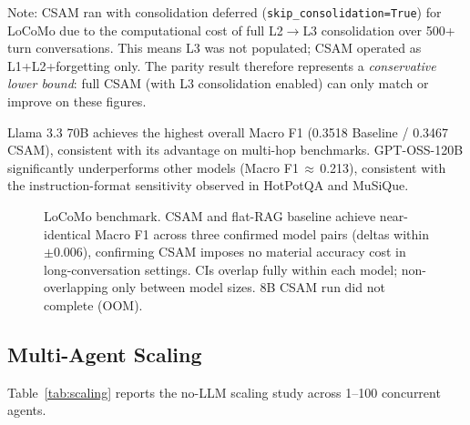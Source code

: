 \documentclass{article}
\begin{document}
Note: CSAM ran with consolidation deferred (\texttt{skip\_consolidation=True})
for LoCoMo due to the computational cost of full L2$\to$L3 consolidation
over 500+ turn conversations.  This means L3 was not populated; CSAM
operated as L1+L2+forgetting only.  The parity result therefore represents
a \emph{conservative lower bound}: full CSAM (with L3 consolidation
enabled) can only match or improve on these figures.

Llama 3.3 70B achieves the highest overall Macro F1 (0.3518 Baseline /
0.3467 CSAM), consistent with its advantage on multi-hop benchmarks.
GPT-OSS-120B significantly underperforms other models (Macro F1\,$\approx$\,0.213),
consistent with the instruction-format sensitivity observed in HotPotQA
and MuSiQue.

\begin{figure}[h]
\centering
{}
\caption{LoCoMo benchmark.  CSAM and flat-RAG baseline achieve near-identical
  Macro F1 across three confirmed model pairs (deltas within $\pm$0.006),
  confirming CSAM imposes no material accuracy cost in long-conversation
  settings.  CIs overlap fully within each model; non-overlapping only
  between model sizes.  8B CSAM run did not complete (OOM).}
\label{fig:locomo}
\end{figure}

\subsection{Multi-Agent Scaling}
\label{sec:scaling}

Table~\ref{tab:scaling} reports the no-LLM scaling study across 1–100
concurrent agents.
\end{document}
